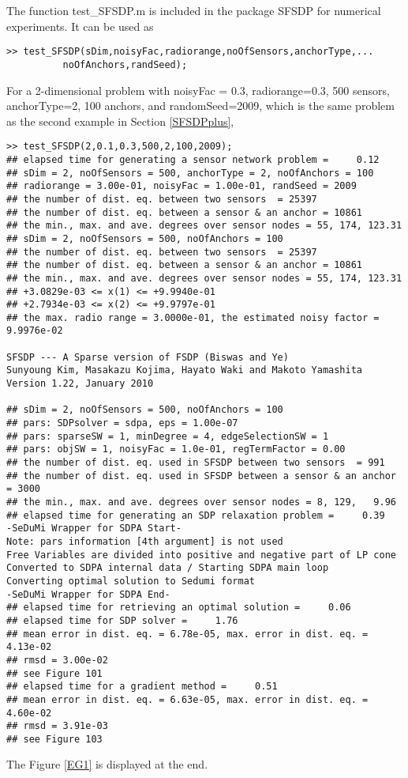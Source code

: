 \documentclass[12pt]{article}
\begin{document}
The function test\_SFSDP.m is included in the package SFSDP  for numerical experiments.
It can be used as 
 \begin{verbatim}
>> test_SFSDP(sDim,noisyFac,radiorange,noOfSensors,anchorType,... 
          noOfAnchors,randSeed);
\end{verbatim} 
For a 2-dimensional problem with noisyFac = 0.3, radiorange=0.3, 500 sensors, anchorType=2, 100 anchors, 
and randomSeed=2009, which is  the same problem as the second
 example in Section \ref{SFSDPplus},
 \begin{verbatim}
>> test_SFSDP(2,0.1,0.3,500,2,100,2009);
## elapsed time for generating a sensor network problem =     0.12
## sDim = 2, noOfSensors = 500, anchorType = 2, noOfAnchors = 100
## radiorange = 3.00e-01, noisyFac = 1.00e-01, randSeed = 2009
## the number of dist. eq. between two sensors  = 25397
## the number of dist. eq. between a sensor & an anchor = 10861
## the min., max. and ave. degrees over sensor nodes = 55, 174, 123.31
## sDim = 2, noOfSensors = 500, noOfAnchors = 100
## the number of dist. eq. between two sensors  = 25397
## the number of dist. eq. between a sensor & an anchor = 10861
## the min., max. and ave. degrees over sensor nodes = 55, 174, 123.31
## +3.0829e-03 <= x(1) <= +9.9940e-01
## +2.7934e-03 <= x(2) <= +9.9797e-01
## the max. radio range = 3.0000e-01, the estimated noisy factor = 9.9976e-02

SFSDP --- A Sparse version of FSDP (Biswas and Ye)
Sunyoung Kim, Masakazu Kojima, Hayato Waki and Makoto Yamashita
Version 1.22, January 2010

## sDim = 2, noOfSensors = 500, noOfAnchors = 100
## pars: SDPsolver = sdpa, eps = 1.00e-07
## pars: sparseSW = 1, minDegree = 4, edgeSelectionSW = 1
## pars: objSW = 1, noisyFac = 1.0e-01, regTermFactor = 0.00
## the number of dist. eq. used in SFSDP between two sensors  = 991
## the number of dist. eq. used in SFSDP between a sensor & an anchor = 3000
## the min., max. and ave. degrees over sensor nodes = 8, 129,   9.96
## elapsed time for generating an SDP relaxation problem =     0.39
-SeDuMi Wrapper for SDPA Start-
Note: pars information [4th argument] is not used
Free Variables are divided into positive and negative part of LP cone
Converted to SDPA internal data / Starting SDPA main loop
Converting optimal solution to Sedumi format
-SeDuMi Wrapper for SDPA End-
## elapsed time for retrieving an optimal solution =     0.06
## elapsed time for SDP solver =     1.76
## mean error in dist. eq. = 6.78e-05, max. error in dist. eq. = 4.13e-02
## rmsd = 3.00e-02
## see Figure 101
## elapsed time for a gradient method =     0.51
## mean error in dist. eq. = 6.63e-05, max. error in dist. eq. = 4.60e-02
## rmsd = 3.91e-03
## see Figure 103
\end{verbatim}
The Figure \ref{EG1} is displayed at the end.
\end{document}
